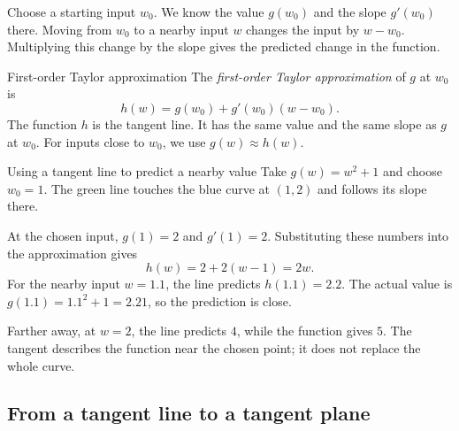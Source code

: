 \documentclass[a4paper,12pt,oneside]{report}
\begin{document}
Choose a starting input $w_0$. We know the value $g(w_0)$ and the
slope $g'(w_0)$ there. Moving from $w_0$ to a nearby input $w$ changes
the input by $w-w_0$. Multiplying this change by the slope gives the
predicted change in the function.

\begin{frameddefn}{First-order Taylor approximation}\label{def:first-order-taylor}
The \emph{first-order Taylor approximation} of $g$ at $w_0$ is
\[
  h(w)=g(w_0)+g'(w_0)(w-w_0).
\]
The function $h$ is the tangent line. It has the same value and the
same slope as $g$ at $w_0$. For inputs close to $w_0$, we use
$g(w)\approx h(w)$.
\end{frameddefn}

\begin{framedexample}{Using a tangent line to predict a nearby value}
Take $g(w)=w^2+1$ and choose $w_0=1$. The green line touches the
blue curve at $(1,2)$ and follows its slope there.

\begin{center}
\end{center}

At the chosen input, $g(1)=2$ and $g'(1)=2$. Substituting these
numbers into the approximation gives
\[
  h(w)=2+2(w-1)=2w.
\]
For the nearby input $w=1.1$, the line predicts $h(1.1)=2.2$.
The actual value is $g(1.1)=1.1^2+1=2.21$, so the prediction is close.

Farther away, at $w=2$, the line predicts $4$, while the function
gives $5$. The tangent describes the function near the chosen point;
it does not replace the whole curve.
\end{framedexample}

\clearpage
\subsection{From a tangent line to a tangent plane}
\end{document}
